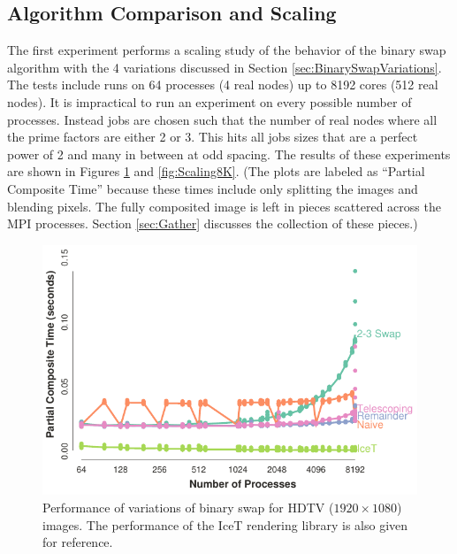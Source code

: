 \documentclass{vgtc}                          %
\newcommand{\textalgorithm}[1]{\textsf{#1}\xspace}
\newcommand{\binaryswap}{\textalgorithm{binary swap}}
\begin{document}
\subsection{Algorithm Comparison and Scaling}
\label{sec:Scaling}

The first experiment performs a scaling study of the behavior of the \binaryswap algorithm with the 4 variations discussed in Section \ref{sec:BinarySwapVariations}.
The tests include runs on 64 processes (4 real nodes) up to 8192 cores (512 real nodes).
It is impractical to run an experiment on every possible number of processes.
Instead jobs are chosen such that the number of real nodes where all the prime factors are either 2 or 3.
This hits all jobs sizes that are a perfect power of 2 and many in between at odd spacing.
The results of these experiments are shown in Figures \ref{fig:ScalingHDTV} and \ref{fig:Scaling8K}.
(The plots are labeled as ``Partial Composite Time'' because these times include only splitting the images and blending pixels.
The fully composited image is left in pieces scattered across the MPI processes.
Section \ref{sec:Gather} discusses the collection of these pieces.)

\begin{figure}
  \centering
  \includegraphics[width=\linewidth]{scaling-hdtv}
  \caption{
    Performance of variations of \binaryswap for HDTV ($1920 \times 1080$) images.
    The performance of the IceT rendering library is also given for reference.
  }
  \label{fig:ScalingHDTV}
\end{figure}
\end{document}
